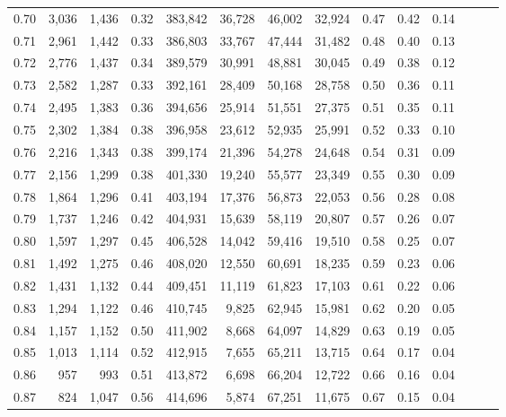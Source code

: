 \begin{tabular}{rrrrrrrrrrrrrr}
0.70 &   3,036 &  1,436 &  0.32 &  383,842 &   36,728 &  46,002 &  32,924 &  0.47 &  0.42 &      0.14 \\
0.71 &   2,961 &  1,442 &  0.33 &  386,803 &   33,767 &  47,444 &  31,482 &  0.48 &  0.40 &      0.13 \\
0.72 &   2,776 &  1,437 &  0.34 &  389,579 &   30,991 &  48,881 &  30,045 &  0.49 &  0.38 &      0.12 \\
0.73 &   2,582 &  1,287 &  0.33 &  392,161 &   28,409 &  50,168 &  28,758 &  0.50 &  0.36 &      0.11 \\
0.74 &   2,495 &  1,383 &  0.36 &  394,656 &   25,914 &  51,551 &  27,375 &  0.51 &  0.35 &      0.11 \\
0.75 &   2,302 &  1,384 &  0.38 &  396,958 &   23,612 &  52,935 &  25,991 &  0.52 &  0.33 &      0.10 \\
0.76 &   2,216 &  1,343 &  0.38 &  399,174 &   21,396 &  54,278 &  24,648 &  0.54 &  0.31 &      0.09 \\
0.77 &   2,156 &  1,299 &  0.38 &  401,330 &   19,240 &  55,577 &  23,349 &  0.55 &  0.30 &      0.09 \\
0.78 &   1,864 &  1,296 &  0.41 &  403,194 &   17,376 &  56,873 &  22,053 &  0.56 &  0.28 &      0.08 \\
0.79 &   1,737 &  1,246 &  0.42 &  404,931 &   15,639 &  58,119 &  20,807 &  0.57 &  0.26 &      0.07 \\
0.80 &   1,597 &  1,297 &  0.45 &  406,528 &   14,042 &  59,416 &  19,510 &  0.58 &  0.25 &      0.07 \\
0.81 &   1,492 &  1,275 &  0.46 &  408,020 &   12,550 &  60,691 &  18,235 &  0.59 &  0.23 &      0.06 \\
0.82 &   1,431 &  1,132 &  0.44 &  409,451 &   11,119 &  61,823 &  17,103 &  0.61 &  0.22 &      0.06 \\
0.83 &   1,294 &  1,122 &  0.46 &  410,745 &    9,825 &  62,945 &  15,981 &  0.62 &  0.20 &      0.05 \\
0.84 &   1,157 &  1,152 &  0.50 &  411,902 &    8,668 &  64,097 &  14,829 &  0.63 &  0.19 &      0.05 \\
0.85 &   1,013 &  1,114 &  0.52 &  412,915 &    7,655 &  65,211 &  13,715 &  0.64 &  0.17 &      0.04 \\
0.86 &     957 &    993 &  0.51 &  413,872 &    6,698 &  66,204 &  12,722 &  0.66 &  0.16 &      0.04 \\
0.87 &     824 &  1,047 &  0.56 &  414,696 &    5,874 &  67,251 &  11,675 &  0.67 &  0.15 &      0.04 \\

\end{tabular}
